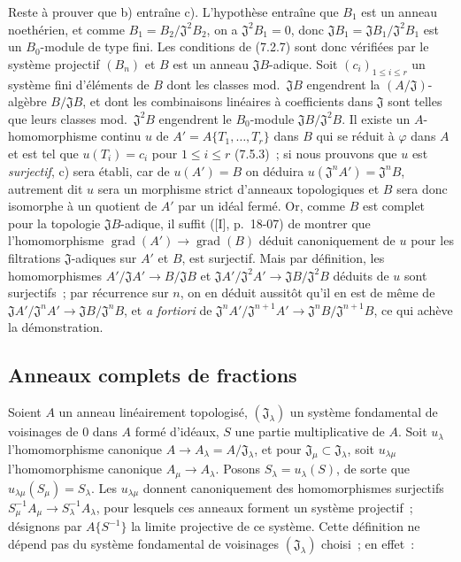 Reste à prouver que b) entraîne c). L'hypothèse entraîne que $B_1$ est un
anneau noethérien, et comme $B_1=B_2/\mathfrak J^2B_2$, on a
$\mathfrak J^2B_1=0$, donc
$\mathfrak JB_1=\mathfrak JB_1/\mathfrak J^2B_1$ est un $B_0$-module de type
fini. Les conditions de (7.2.7) sont donc vérifiées par le système projectif
$(B_n)$ et $B$ est un anneau $\mathfrak JB$-adique. Soit
$(c_i)_{1\leq i\leq r}$ un système fini d'éléments de $B$ dont les classes
mod.~$\mathfrak JB$ engendrent la $(A/\mathfrak J)$-algèbre
$B/\mathfrak JB$, et dont les combinaisons linéaires à coefficients dans
$\mathfrak J$ sont telles que leurs classes mod.~$\mathfrak J^2B$ engendrent
le $B_0$-module $\mathfrak JB/\mathfrak J^2B$. Il existe un
$A$-homomorphisme continu $u$ de $A'=A\{T_1,\ldots,T_r\}$ dans $B$ qui se
réduit à $\varphi$ dans $A$ et est tel que $u(T_i)=c_i$ pour $1\leq i\leq r$
(7.5.3)~; si nous prouvons que $u$ est \emph{surjectif}, c) sera établi, car de
$u(A')=B$ on déduira $u(\mathfrak J^nA')=\mathfrak J^nB$, autrement dit $u$
sera un morphisme strict d'anneaux topologiques et $B$ sera donc isomorphe à un
quotient de $A'$ par un idéal fermé. Or, comme $B$ est complet pour la topologie
$\mathfrak JB$-adique, il suffit ([I], p.~18-07) de montrer que
l'homomorphisme $\operatorname{grad}(A')\to\operatorname{grad}(B)$ déduit
canoniquement de $u$ pour les filtrations $\mathfrak J$-adiques sur $A'$ et
$B$, est surjectif. Mais par définition, les homomorphismes
$A'/\mathfrak JA'\to B/\mathfrak JB$ et
$\mathfrak JA'/\mathfrak J^2A'\to\mathfrak JB/\mathfrak J^2B$ déduits de $u$
sont surjectifs~; par récurrence sur $n$, on en déduit aussitôt qu'il en est de
même de $\mathfrak JA'/\mathfrak J^nA'\to\mathfrak JB/\mathfrak J^nB$, et
\emph{a fortiori} de
$\mathfrak J^nA'/\mathfrak J^{n+1}A'\to
\mathfrak J^nB/\mathfrak J^{n+1}B$, ce qui achève la démonstration.

\subsection{Anneaux complets de fractions}
\label{subsection:0.7.6-fr}

\begin{env}[7.6.1]
\label{0.7.6.1-fr}
Soient $A$ un anneau linéairement topologisé, $(\mathfrak J_\lambda)$ un
système fondamental de voisinages de 0 dans $A$ formé d'idéaux, $S$ une partie
multiplicative de $A$. Soit $u_\lambda$ l'homomorphisme canonique
$A\to A_\lambda=A/\mathfrak J_\lambda$, et pour
$\mathfrak J_\mu\subset\mathfrak J_\lambda$, soit $u_{\lambda\mu}$
l'homomorphisme canonique $A_\mu\to A_\lambda$. Posons
$S_\lambda=u_\lambda(S)$, de sorte que
$u_{\lambda\mu}(S_\mu)=S_\lambda$. Les $u_{\lambda\mu}$ donnent
canoniquement des homomorphismes surjectifs
$S_\mu^{-1}A_\mu\to S_\lambda^{-1}A_\lambda$, pour lesquels ces anneaux
forment un système projectif~; désignons par $A\{S^{-1}\}$ la limite
projective de ce système. Cette définition ne dépend pas du système fondamental
de voisinages $(\mathfrak J_\lambda)$ choisi~; en effet~:
\end{env}

